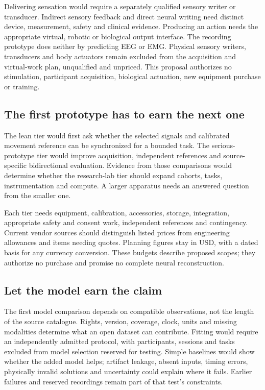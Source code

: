 Delivering sensation would require a separately qualified sensory writer or
transducer. Indirect sensory feedback and direct neural writing need distinct
device, measurement, safety and clinical evidence. Producing an action needs
the appropriate virtual, robotic or biological output interface. The recording
prototype does neither by predicting EEG or EMG. Physical sensory writers,
transducers and body actuators remain excluded from the acquisition and
virtual-work plan, unqualified and unpriced. This proposal authorizes no
stimulation, participant acquisition, biological actuation, new equipment
purchase or training.

\subsection{The first prototype has to earn the next one}

The lean tier would first ask whether the selected signals and calibrated
movement reference can be synchronized for a bounded task. The serious-prototype
tier would improve acquisition, independent references and source-specific
bidirectional evaluation. Evidence from those comparisons would determine
whether the research-lab tier should expand cohorts, tasks, instrumentation and
compute. A larger apparatus needs an answered question from the smaller one.

Each tier needs equipment, calibration, accessories, storage, integration,
appropriate safety and consent work, independent references and contingency.
Current vendor sources should distinguish listed prices from engineering
allowances and items needing quotes. Planning figures stay in USD, with a
dated basis for any currency conversion. These budgets describe proposed
scopes; they authorize no purchase and promise no complete neural reconstruction.

\subsection{Let the model earn the claim}

The first model comparison depends on compatible observations, not the
length of the source catalogue. Rights, version, coverage, clock, units and
missing modalities determine what an open dataset can contribute. Fitting
would require an independently admitted protocol, with participants, sessions
and tasks excluded from model selection reserved for testing. Simple baselines
would show whether the added model helps; artifact leakage, absent inputs,
timing errors, physically invalid solutions and uncertainty could explain where
it fails. Earlier failures and reserved recordings remain part of that test's
constraints.

